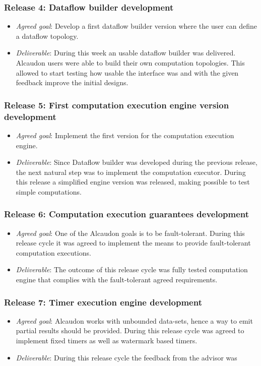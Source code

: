 \subsubsection{Release 4: Dataflow builder development}
\begin{itemize}
\item \textit{Agreed goal}: Develop a first dataflow builder version where the
  user can define a dataflow topology.
\item \textit{Deliverable}: During this week an usable dataflow builder was
  delivered. Alcaudon users were able to build their own computation topologies.
  This allowed to start testing how usable the interface was and with the given
  feedback improve the initial designs.
\end{itemize}

\subsubsection{Release 5: First computation execution engine version development}
\begin{itemize}
\item \textit{Agreed goal}: Implement the first version for the computation
  execution engine.
\item \textit{Deliverable}: Since Dataflow builder was developed during the previous
  release, the next natural step was to implement the computation executor.
  During this release a simplified engine version was released, making possible
  to test simple computations.
\end{itemize}

\subsubsection{Release 6: Computation execution guarantees development}
\begin{itemize}
\item \textit{Agreed goal}: One of the Alcaudon goals is to be fault-tolerant.
  During this release cycle it was agreed to implement the means to provide
  fault-tolerant computation executions.
\item \textit{Deliverable}: The outcome of this release cycle was fully tested
  computation engine that complies with the fault-tolerant agreed requirements.
\end{itemize}

\subsubsection{Release 7: Timer execution engine development}
\begin{itemize}
\item \textit{Agreed goal}: Alcaudon works with unbounded data-sets, hence a way to
  emit partial results should be provided. During this release cycle was agreed to implement
  fixed timers as well as watermark based timers.
\item \textit{Deliverable}: During this release cycle the feedback from the advisor
  was
\end{itemize}

